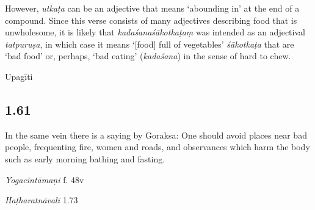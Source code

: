 \begin{ekdosis}
\begin{philcomm}[hp01_060]
However, \emph{utkaṭa} can be an adjective that means ‘abounding in’ at the end of a compound. Since this verse consists of many adjectives describing food that is unwholesome, it is likely that \emph{kadaśanaśākotkaṭaṃ} was intended as an adjectival \emph{tatpuruṣa}, in which case it means ‘[food] full of vegetables' \emph{śākotkaṭa} that are `bad food' or, perhaps, `bad eating' (\emph{kadaśana}) in the sense of hard to chew. 
\end{philcomm}

\begin{metre}[hp01_060]
Upagīti 
\end{metre}

\subsection*{1.61}
\begin{translation}[hp01_061]
In the same vein there is a saying by Goraksa:
One should avoid places near bad people, frequenting fire, women and roads, and observances which harm the body such as early morning bathing and fasting.
\end{translation}




\begin{testimonia}[hp01_061]
\emph{Yogacintāmaṇi} f. 48v

\begin{versinnote}
\end{versinnote}

\emph{Haṭharatnāvalī} 1.73 

\begin{versinnote}
\tl{\var{°prīti°] °prāntaṃ P, prāptaṃ T,t1. kāyakleśādikaṃ ] kāyakleśavidhiṃ P,T.}\\!}
\end{versinnote}


\end{testimonia}
\end{ekdosis}
